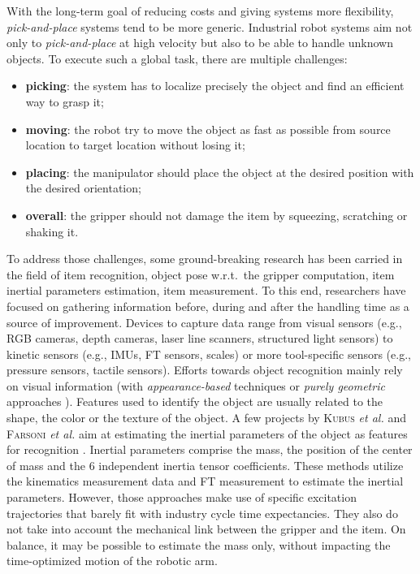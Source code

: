 \documentclass[/home/francois/latex/report/main.tex]{subfiles}
\begin{document}
With the long-term goal of reducing costs and giving systems more flexibility, \textit{pick-and-place} systems tend to be more generic. Industrial robot systems aim not only to \textit{pick-and-place} at high velocity but also to be able to handle unknown objects. To execute such a global task, there are multiple challenges:
\begin{itemize}
    \item \textbf{picking}: the system has to localize precisely the object and find an efficient way to grasp it;
    \item \textbf{moving}: the robot try to move the object as fast as possible from source location to target location without losing it;
    \item \textbf{placing}: the manipulator should place the object at the desired position with the desired orientation;
    \item \textbf{overall}: the gripper should not damage the item by squeezing, scratching or shaking it.
\end{itemize}

To address those challenges, some ground-breaking research has been carried in the field of item recognition, object pose w.r.t.\ the gripper computation, item inertial parameters estimation, item measurement. To this end, researchers have focused on gathering information before, during and after the handling time as a source of improvement. Devices to capture data range from visual sensors (e.g., RGB cameras, depth cameras, laser line scanners, structured light sensors) to kinetic sensors (e.g., \ac{IMUs}, \ac{FT} sensors, scales) or more tool-specific sensors (e.g., pressure sensors, tactile sensors). Efforts towards object recognition mainly rely on visual information (with \textit{appearance-based} techniques \cite{Carmichael2002, Schmid1997, Viola2001, Murase1993} or \textit{purely geometric} approaches \cite{Hut1987, Sethi2001}). Features used to identify the object are usually related to the shape, the color or the texture of the object. A few projects by \textsc{Kubus} \textit{et al.} and \textsc{Farsoni} \textit{et al.} aim at estimating the inertial parameters of the object as features for recognition \cite{Kubus2008, Kubus2007, Kubus2014, Farsoni2018}. Inertial parameters comprise the mass, the position of the center of mass and the 6 independent inertia tensor coefficients. These methods utilize the kinematics measurement data and \ac{FT} measurement to estimate the inertial parameters. However, those approaches make use of specific excitation trajectories that barely fit with industry cycle time expectancies. They also do not take into account the mechanical link between the gripper and the item. On balance, it may be possible to estimate the mass only, without impacting the time-optimized motion of the robotic arm.
\end{document}
